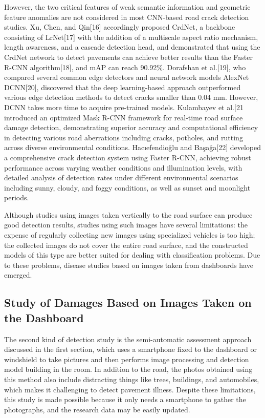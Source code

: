 \documentclass[sensors,article,submit,moreauthors]{Definitions/mdpi}
\begin{document}
    However, the two critical features of weak semantic information and geometric feature anomalies are not considered in most CNN-based road crack detection studies. Xu, Chen, and Qin[16]\citep{xu2021cnn} accordingly proposed CrdNet, a backbone consisting of LrNet[17]\citep{sun2021improving} with the addition of a multiscale aspect ratio mechanism, length awareness, and a cascade detection head, and demonstrated that using the CrdNet network to detect pavements can achieve better results than the Faster R-CNN algorithm[18]\citep{ren2015faster}, and mAP can reach 90.92\%. Dorafshan et al.[19]\citep{dorafshan2018comparison}, who compared several common edge detectors and neural network models AlexNet DCNN[20]\citep{lecun1998gradient}, discovered that the deep learning-based approach outperformed various edge detection methods to detect cracks smaller than 0.04 mm. However, DCNN takes more time to acquire pre-trained models. Kulambayev et al.[21\citep{kulambayev2023real} introduced an optimized Mask R-CNN framework for real-time road surface damage detection, demonstrating superior accuracy and computational efficiency in detecting various road aberrations including cracks, potholes, and rutting across diverse environmental conditions. Hacıefendioğlu and Başağa[22]\citep{haciefendiouglu2022concrete} developed a comprehensive crack detection system using Faster R-CNN, achieving robust performance across varying weather conditions and illumination levels, with detailed analysis of detection rates under different environmental scenarios including sunny, cloudy, and foggy conditions, as well as sunset and moonlight periods.


    Although studies using images taken vertically to the road surface can produce good detection results, studies using such images have several limitations: the expense of regularly collecting new images using specialized vehicles is too high; the collected images do not cover the entire road surface, and the constructed models of this type are better suited for dealing with classification problems. Due to these problems, disease studies based on images taken from dashboards have emerged.

    \subsection{Study of Damages Based on Images Taken on the Dashboard}


    The second kind of detection study is the semi-automatic assessment approach discussed in the first section, which uses a smartphone fixed to the dashboard or windshield to take pictures and then performs image processing and detection model building in the room. In addition to the road, the photos obtained using this method also include distracting things like trees, buildings, and automobiles, which makes it challenging to detect pavement illness. Despite these limitations, this study is made possible because it only needs a smartphone to gather the photographs, and the research data may be easily updated.
\end{document}
